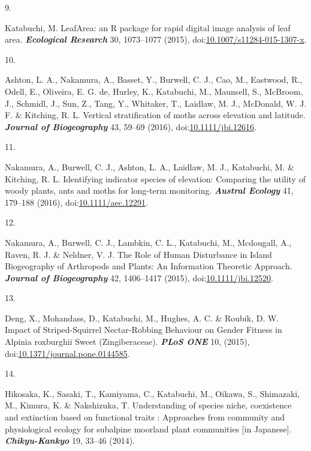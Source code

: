 \documentclass[
]{article}
\newlength{\cslhangindent}
\newlength{\csllabelwidth}
\newlength{\cslentryspacingunit} %
\newenvironment{CSLReferences}[2] %
 {%
  \setlength{\parindent}{0pt}
  \ifodd #1
  \let\oldpar\par
  \def\par{\hangindent=\cslhangindent\oldpar}
  \fi
  \setlength{\parskip}{#2\cslentryspacingunit}
 }%
 {}
\newcommand{\CSLLeftMargin}[1]{\parbox[t]{\csllabelwidth}{#1}}
\newcommand{\CSLRightInline}[1]{\parbox[t]{\linewidth - \csllabelwidth}{#1}\break}
\begin{document}
\begin{CSLReferences}{0}{0}
\leavevmode{}%
\CSLLeftMargin{9. }
\CSLRightInline{Katabuchi, M. {LeafArea: an R package for rapid digital
image analysis of leaf area}. \textbf{\emph{Ecological Research}} 30,
1073--1077 (2015),
doi:\href{https://doi.org/10.1007/s11284-015-1307-x}{10.1007/s11284-015-1307-x}.}

\leavevmode{}%
\CSLLeftMargin{10. }
\CSLRightInline{Ashton, L. A., Nakamura, A., Basset, Y., Burwell, C. J.,
Cao, M., Eastwood, R., Odell, E., Oliveira, E. G. de, Hurley, K.,
Katabuchi, M., Maunsell, S., McBroom, J., Schmidl, J., Sun, Z., Tang,
Y., Whitaker, T., Laidlaw, M. J., McDonald, W. J. F. \& Kitching, R. L.
Vertical stratification of moths across elevation and latitude.
\textbf{\emph{Journal of Biogeography}} 43, 59--69 (2016),
doi:\href{https://doi.org/10.1111/jbi.12616}{10.1111/jbi.12616}.}

\leavevmode{}%
\CSLLeftMargin{11. }
\CSLRightInline{Nakamura, A., Burwell, C. J., Ashton, L. A., Laidlaw, M.
J., Katabuchi, M. \& Kitching, R. L. {Identifying indicator species of
elevation: Comparing the utility of woody plants, ants and moths for
long-term monitoring}. \textbf{\emph{Austral Ecology}} 41, 179--188
(2016),
doi:\href{https://doi.org/10.1111/aec.12291}{10.1111/aec.12291}.}

\leavevmode{}%
\CSLLeftMargin{12. }
\CSLRightInline{Nakamura, A., Burwell, C. J., Lambkin, C. L., Katabuchi,
M., Mcdougall, A., Raven, R. J. \& Neldner, V. J. {The Role of Human
Disturbance in Island Biogeography of Arthropods and Plants: An
Information Theoretic Approach}. \textbf{\emph{Journal of Biogeography}}
42, 1406--1417 (2015),
doi:\href{https://doi.org/10.1111/jbi.12520}{10.1111/jbi.12520}.}

\leavevmode{}%
\CSLLeftMargin{13. }
\CSLRightInline{Deng, X., Mohandass, D., Katabuchi, M., Hughes, A. C. \&
Roubik, D. W. Impact of {Striped}-{Squirrel Nectar}-{Robbing Behaviour}
on {Gender Fitness} in {Alpinia} roxburghii {Sweet} ({Zingiberaceae}).
\textbf{\emph{PLoS ONE}} 10, (2015),
doi:\href{https://doi.org/10.1371/journal.pone.0144585}{10.1371/journal.pone.0144585}.}

\leavevmode{}%
\CSLLeftMargin{14. }
\CSLRightInline{Hikosaka, K., Sasaki, T., Kamiyama, C., Katabuchi, M.,
Oikawa, S., Shimazaki, M., Kimura, K. \& Nakshizuka, T. Understanding of
species niche, coexistence and extinction based on functional traits :
Approaches from community and physiological ecology for subalpine
moorland plant communities {[}in {Japanese}{]}.
\textbf{\emph{Chikyu-Kankyo}} 19, 33--46 (2014).}


\end{CSLReferences}
\end{document}
